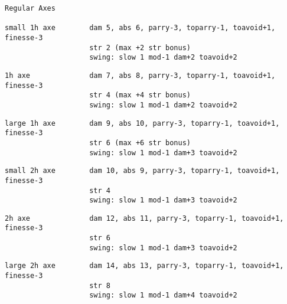 \goodbreak \small \begin{samepage} \begin{verbatim}
Regular Axes

small 1h axe        dam 5, abs 6, parry-3, toparry-1, toavoid+1, finesse-3
                    str 2 (max +2 str bonus)
                    swing: slow 1 mod-1 dam+2 toavoid+2
\end{verbatim} \blocklistgap \begin{verbatim}
1h axe              dam 7, abs 8, parry-3, toparry-1, toavoid+1, finesse-3
                    str 4 (max +4 str bonus)
                    swing: slow 1 mod-1 dam+2 toavoid+2
\end{verbatim} \blocklistgap \begin{verbatim}
large 1h axe        dam 9, abs 10, parry-3, toparry-1, toavoid+1, finesse-3
                    str 6 (max +6 str bonus)
                    swing: slow 1 mod-1 dam+3 toavoid+2
\end{verbatim} \blocklistgap \begin{verbatim}
small 2h axe        dam 10, abs 9, parry-3, toparry-1, toavoid+1, finesse-3
                    str 4
                    swing: slow 1 mod-1 dam+3 toavoid+2
\end{verbatim} \blocklistgap \begin{verbatim}
2h axe              dam 12, abs 11, parry-3, toparry-1, toavoid+1, finesse-3
                    str 6
                    swing: slow 1 mod-1 dam+3 toavoid+2
\end{verbatim} \blocklistgap \begin{verbatim}
large 2h axe        dam 14, abs 13, parry-3, toparry-1, toavoid+1, finesse-3
                    str 8
                    swing: slow 1 mod-1 dam+4 toavoid+2
\end{verbatim} \end{samepage} \normalsize \goodbreak

\

